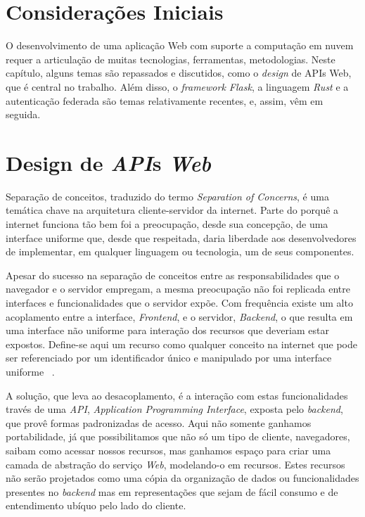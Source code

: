 \label{chapter:metodos}
\section{Considerações Iniciais}
O desenvolvimento de uma aplicação Web com suporte a computação em nuvem
requer a articulação de muitas tecnologias, ferramentas, metodologias.
Neste capítulo, alguns temas são repassados e discutidos, como 
o \emph{design} de APIs Web, que é central no trabalho.
Além disso, o \emph{framework Flask}, a linguagem \emph{Rust} e 
a autenticação federada são temas relativamente recentes, e, assim,
vêm em seguida.


\section{Design de \emph{API}s \emph{Web}}
Separação de conceitos, traduzido do termo \emph{Separation of Concerns}, é uma temática 
chave na arquitetura cliente-servidor da internet. Parte do porquê a internet funciona tão bem
foi a preocupação, desde sua concepção, de uma interface uniforme que, desde que respeitada, 
 daria liberdade aos desenvolvedores de implementar, em qualquer linguagem ou tecnologia,
 um de seus componentes. 

Apesar do sucesso na separação de conceitos entre as responsabilidades que o navegador 
e o servidor empregam, a mesma preocupação não foi replicada entre interfaces e 
funcionalidades que o servidor expõe. 
Com frequência existe um alto acoplamento entre a interface, \emph{Frontend},
e o servidor, \emph{Backend}, o que resulta em uma interface não uniforme para interação 
dos recursos que deveriam estar expostos. Define-se aqui um recurso como qualquer conceito 
na internet que pode ser referenciado por um identificador único e manipulado por uma interface uniforme 
\ \cite{masse2011rest}.

A solução, que leva ao desacoplamento, é a interação com estas
funcionalidades través de uma \emph{API}, \emph{Application Programming Interface},
exposta pelo \emph{backend}, que provê formas padronizadas 
de acesso. Aqui não somente ganhamos portabilidade, já que possibilitamos que não só 
um tipo de cliente, navegadores, saibam como acessar nossos recursos, mas ganhamos espaço 
para criar uma camada de abstração do serviço \emph{Web}, modelando-o em recursos.
Estes recursos não serão projetados como uma cópia da organização de dados ou funcionalidades 
presentes no \emph{backend} mas em representações que sejam de fácil consumo e de entendimento 
ubíquo pelo lado do cliente.

